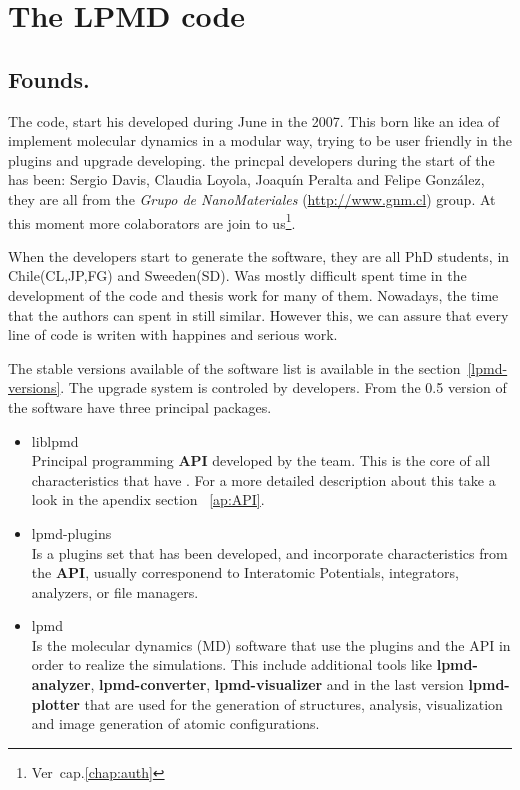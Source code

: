 \chapter{The LPMD code}
\label{chap:lpmd}

\section{Founds.}

The {\lpmd} code, start his developed during June in the 2007. This born like
an idea of implement molecular dynamics in a modular way, trying to be
user friendly  in the plugins and upgrade developing. the princpal developers
during the start of the has been: Sergio Davis, Claudia Loyola, Joaqu\'in
Peralta and Felipe Gonz\'alez, they are all from the \textit{Grupo de
NanoMateriales} (\url{http://www.gnm.cl}) group. At this moment more
colaborators are join to us\footnote{Ver~cap.\ref{chap:auth}}.

When the developers start to generate the {\lpmd} software, they are all PhD
students, in Chile(CL,JP,FG) and Sweeden(SD). Was mostly difficult spent time
in the development of the code and thesis work for many of them. Nowadays, the
time that the authors can spent in {\lpmd} still similar. However this, we can
assure that every line of code is writen with happines and serious work. 

The stable versions available of the software list is available in the
section~\ref{lpmd-versions}. The upgrade system is controled by developers.
From the 0.5 version of {\lpmd} the software have three principal packages.

\begin{itemize}
 \item liblpmd \\
Principal programming \textbf{API} developed by the team. This is
the core of all characteristics that have {\lpmd}. For a more detailed
description about this take a look in the apendix section ~\ref{ap:API}.
 \item lpmd-plugins \\
Is a plugins set that has been developed, and incorporate characteristics from
the \textbf{API}, usually corresponend to Interatomic Potentials,
integrators, analyzers, or file managers.
 \item lpmd \\
{\lpmd} Is the molecular dynamics (MD) software that use the plugins and the
API in order to realize the simulations. This include additional tools
like \textbf{lpmd-analyzer}, \textbf{lpmd-converter}, \textbf{lpmd-visualizer}
and in the last version \textbf{lpmd-plotter} that are used for the generation
of structures, analysis, visualization and image generation of atomic
configurations.
\end{itemize}

